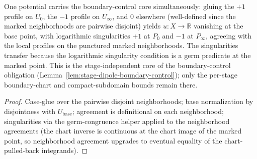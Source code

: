 \begin{lemma}
\label{lem:stage-dipole-glued-potential}
One potential carries the boundary-control core simultaneously: gluing the
\(+1\) profile on \(U_0\), the \(-1\) profile on \(U_\infty\), and \(0\)
elsewhere (well-defined since the marked neighborhoods are pairwise
disjoint) yields \(u : X \to \mathbb{R}\) vanishing at the base point,
with logarithmic singularities \(+1\) at \(P_0\) and \(-1\) at
\(P_\infty\), agreeing with the local profiles on the punctured marked
neighborhoods.  The singularities transfer because the logarithmic
singularity condition is a germ predicate at the marked point.  This is
the stage-independent core of the boundary-control obligation
(Lemma~\ref{lem:stage-dipole-boundary-control}); only the per-stage
boundary-chart and compact-subdomain bounds remain there.
\leanok
\end{lemma}
\begin{proof}\leanok
Case-glue over the pairwise disjoint neighborhoods; base normalization by
disjointness with \(U_{\mathrm{base}}\); agreement is definitional on each
neighborhood; singularities via the germ-congruence helper applied to the
neighborhood agreements (the chart inverse is continuous at the chart
image of the marked point, so neighborhood agreement upgrades to eventual
equality of the chart-pulled-back integrands).
\end{proof}

